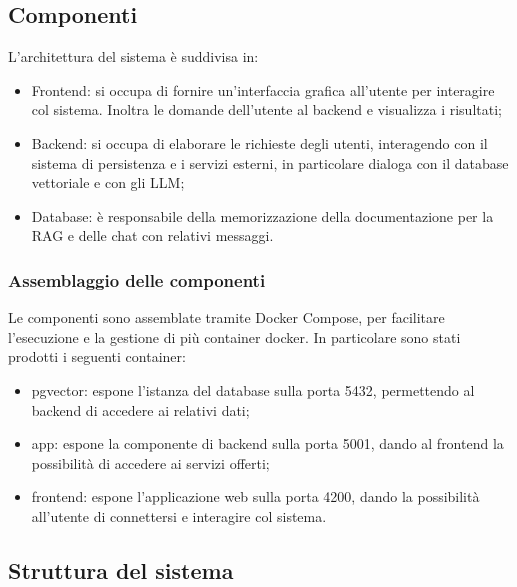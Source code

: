 \subsection{Componenti}
L'architettura del sistema è suddivisa in:
\begin{itemize}
    \item Frontend: si occupa di fornire un'interfaccia grafica all'utente per interagire col sistema. Inoltra le domande dell'utente al backend e visualizza i risultati;
    \item Backend: si occupa di elaborare le richieste degli utenti, interagendo con il sistema di persistenza e i servizi esterni, in particolare dialoga con il database vettoriale e con gli LLM;
    \item Database: è responsabile della memorizzazione della documentazione per la RAG e delle chat con relativi messaggi.
\end{itemize}
\subsubsection{Assemblaggio delle componenti}
Le componenti sono assemblate tramite Docker Compose, per facilitare l'esecuzione e la gestione di più container docker. 
In particolare sono stati prodotti i seguenti container:
\begin{itemize}
    \item pgvector: espone l'istanza del database sulla porta 5432, permettendo al backend di accedere ai relativi dati;
    \item app: espone la componente di backend sulla porta 5001, dando al frontend la possibilità di accedere ai servizi offerti;
    \item frontend: espone l'applicazione web sulla porta 4200, dando la possibilità all'utente di connettersi e interagire col sistema.
\end{itemize}
\subsection{Struttura del sistema}
